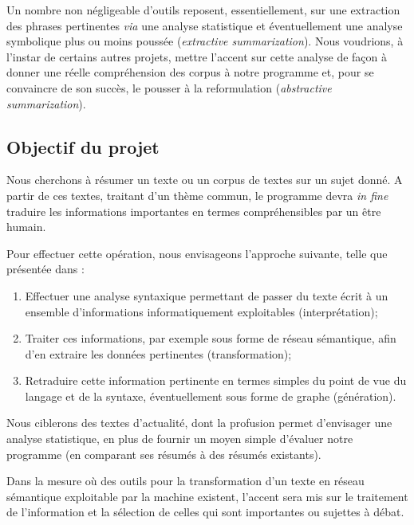 \documentclass{article}           %
\begin{document}
Un nombre non négligeable d'outils reposent, essentiellement, sur une extraction des phrases pertinentes \textit{via} une analyse statistique et éventuellement une analyse symbolique plus ou moins poussée (\textit{extractive summarization}). Nous voudrions, à l'instar de certains autres projets, mettre l'accent sur cette analyse de façon à donner une réelle compréhension des corpus à notre programme et, pour se convaincre de son succès, le pousser à la reformulation (\textit{abstractive summarization}).

\subsection{Objectif du projet}
Nous cherchons à résumer un texte ou un corpus de textes sur un sujet donné. A partir de ces textes, traitant d'un thème commun, le programme devra \textit{in fine} traduire les informations importantes en termes compréhensibles par un être humain.


Pour effectuer cette opération, nous envisageons l'approche suivante, telle que présentée dans \cite{jones_automatic_2007} :

\begin{enumerate}
 \item Effectuer une analyse syntaxique permettant de passer du texte écrit à un ensemble d'informations informatiquement exploitables (interprétation);
 \item Traiter ces informations, par exemple sous forme de réseau sémantique, afin d'en extraire les données pertinentes (transformation);
 \item Retraduire cette information pertinente en termes simples du point de vue du langage et de la syntaxe, éventuellement sous forme de graphe (génération).
\end{enumerate}


Nous ciblerons des textes d'actualité, dont la profusion permet d'envisager une analyse statistique, en plus de fournir un moyen simple d'évaluer notre programme (en comparant ses résumés à des résumés existants).

Dans la mesure où des outils pour la transformation d'un texte en réseau sémantique exploitable par la machine existent, l'accent sera mis sur le traitement de l'information et la sélection de celles qui sont importantes ou sujettes à débat.

\end{document}
